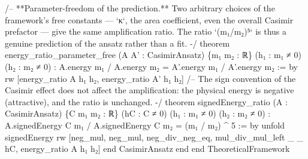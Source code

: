 \documentclass[11pt,a4paper]{article}
\begin{document}
{\mbox{}
/-- **Parameter-freedom of the prediction.**  Two arbitrary choices of the
framework's free constants — `κ`, the area coefficient, even the overall Casimir
prefactor — give the same amplification ratio.  The ratio `(m₁/m₂)⁵` is thus a
genuine prediction of the ansatz rather than a fit. -/
theorem energy\_\allowbreak{}ratio\_\allowbreak{}parameter\_\allowbreak{}free (A A' : CasimirAnsatz) \{m₁ m₂ : ℝ\}
    (h₁ : m₁ ≠ 0) (h₂ : m₂ ≠ 0) :
    A.energy m₁ / A.energy m₂ = A'.energy m₁ / A'.energy m₂ := by
  rw [energy\_\allowbreak{}ratio A h₁ h₂, energy\_\allowbreak{}ratio A' h₁ h₂]
\mbox{}
/-- The sign convention of the Casimir effect does not affect the amplification:
the physical energy is negative (attractive), and the ratio is unchanged. -/
theorem signedEnergy\_\allowbreak{}ratio (A : CasimirAnsatz) \{C m₁ m₂ : ℝ\} (hC : C ≠ 0)
    (h₁ : m₁ ≠ 0) (h₂ : m₂ ≠ 0) :
    A.signedEnergy C m₁ / A.signedEnergy C m₂ = (m₁ / m₂) \textasciicircum{} 5 := by
  unfold signedEnergy
  rw [neg\_\allowbreak{}mul, neg\_\allowbreak{}mul, neg\_\allowbreak{}div\_\allowbreak{}neg\_\allowbreak{}eq, mul\_\allowbreak{}div\_\allowbreak{}mul\_\allowbreak{}left \_\allowbreak{} \_\allowbreak{} hC, energy\_\allowbreak{}ratio A h₁ h₂]
\mbox{}
end CasimirAnsatz
\mbox{}
end
\mbox{}
end TheoreticalFramework
\mbox{}
}

\clearpage
\end{document}
